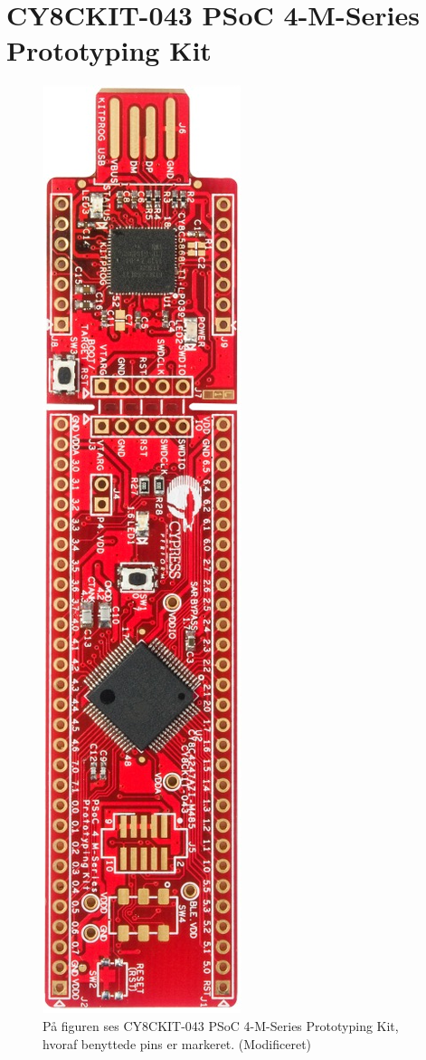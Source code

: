 \chapter{CY8CKIT-043 PSoC 4-M-Series Prototyping Kit}\vspace{-.75cm}\label{MCU_stor}
\begin{figure}[H]
	\centering
	\includegraphics[scale=0.5,angle=-90]{figures/qBilag/cy8ckit_PSoC_4200M.jpg}
	\caption{På figuren ses CY8CKIT-043 PSoC 4-M-Series Prototyping Kit, hvoraf benyttede pins er markeret. \citep{CYPRESS2016PSoC} (Modificeret)}
	\label{fig:bilag_MCU_stor}
\end{figure}